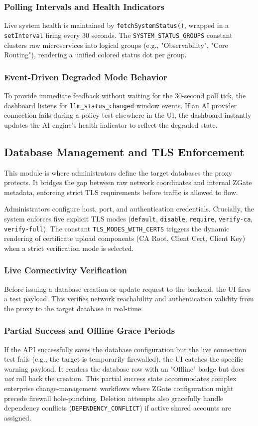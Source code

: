 \subsubsection{Polling Intervals and Health Indicators}
Live system health is maintained by \texttt{fetchSystemStatus()}, wrapped in a \texttt{setInterval} firing every 30 seconds. The \texttt{SYSTEM\_STATUS\_GROUPS} constant clusters raw microservices into logical groups (e.g., "Observability", "Core Routing"), rendering a unified colored status dot per group.

\subsubsection{Event-Driven Degraded Mode Behavior}
To provide immediate feedback without waiting for the 30-second poll tick, the dashboard listens for \texttt{llm\_status\_changed} window events. If an AI provider connection fails during a policy test elsewhere in the UI, the dashboard instantly updates the AI engine's health indicator to reflect the degraded state.

\subsection{Database Management and TLS Enforcement}
This module is where administrators define the target databases the proxy protects. It bridges the gap between raw network coordinates and internal ZGate metadata, enforcing strict TLS requirements before traffic is allowed to flow.

Administrators configure host, port, and authentication credentials. Crucially, the system enforces five explicit TLS modes (\texttt{default}, \texttt{disable}, \texttt{require}, \texttt{verify-ca}, \texttt{verify-full}). The constant \texttt{TLS\_MODES\_WITH\_CERTS} triggers the dynamic rendering of certificate upload components (CA Root, Client Cert, Client Key) when a strict verification mode is selected.

\subsubsection{Live Connectivity Verification}
Before issuing a database creation or update request to the backend, the UI fires a test payload. This verifies network reachability and authentication validity from the proxy to the target database in real-time.

\subsubsection{Partial Success and Offline Grace Periods}
If the API successfully saves the database configuration but the live connection test fails (e.g., the target is temporarily firewalled), the UI catches the specific warning payload. It renders the database row with an "Offline" badge but does \textit{not} roll back the creation. This partial success state accommodates complex enterprise change-management workflows where ZGate configuration might precede firewall hole-punching. Deletion attempts also gracefully handle dependency conflicts (\texttt{DEPENDENCY\_CONFLICT}) if active shared accounts are assigned.

